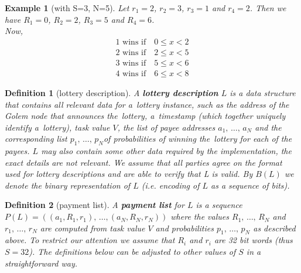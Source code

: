 \documentclass[a4paper]{article}
\newtheorem*{dfnt}{Definition}
\newtheorem*{exmp}{Example}
\begin{document}
    \begin{exmp}[with S=3, N=5]
        Let $r_1 = 2$, $r_2 = 3$, $r_3 = 1$ and $r_4 = 2$. Then we have $R_1 = 0$, $R_2 = 2$, $R_3 = 5$ and $R_4 = 6$.\\
        Now,
        \begin{displaymath}
            \begin{array}{c}
                1 \text{ wins if} \quad 0 \leq x < 2\\
                2 \text{ wins if} \quad 2 \leq x < 5\\
                3 \text{ wins if} \quad 5 \leq x < 6\\
                4 \text{ wins if} \quad 6 \leq x < 8
            \end{array}
        \end{displaymath}
    \end{exmp}

    \begin{dfnt}[lottery description]
        A \textbf{lottery description} $L$ is a data structure that contains all relevant data for a~lottery instance,
        such as the address of the Golem node that announces the~lottery, a~timestamp (which together uniquely identify
        a~lottery), task value $V$, the list of payee addresses $a_1,\,\ldots,\, a_N$ and the corresponding list
        $p_1, \,\ldots,\, p_N $of probabilities of winning the~lottery for each of the payees. $L$ may also contain
        some other data required by the implementation, the exact details are not relevant. We assume that all parties
        agree on the format used for lottery descriptions and are able to verify that L is valid. By $B(L)$ we denote
        the binary representation of $L$ (i.e. encoding of $L$ as a sequence of bits).
    \end{dfnt}


    \begin{dfnt}[payment list]
        A \textbf{payment list} for $L$ is a sequence $P(L) = ((a_1, R_1, r_1), \,\ldots, (a_N, R_N, r_N))$ where the values
        $R_1,\,\ldots,\, R_N$ and $r_1,\,\ldots,\, r_N$ are computed from task value $V$ and probabilities
        $p_1,\,\ldots,\,p_N$ as described above. To restrict our attention we assume that $R_i$ and $r_i$ are 32 bit
        words (thus $S = 32$). The definitions below can be adjusted to other values of $S$ in a straightforward way.
    \end{dfnt}
\end{document}
